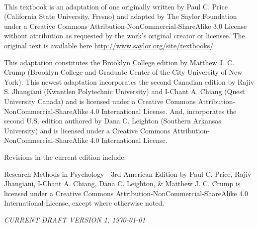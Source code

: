\documentclass[oneside]{tufte-book}
\begin{document}
\newpage
\begin{fullwidth}
~\vfill
\thispagestyle{empty}
\setlength{\parindent}{0pt}
\setlength{\parskip}{\baselineskip}

\par{}

\par

This textbook is an adaptation of one originally written by Paul C. Price (California State University, Fresno) and adapted by The Saylor Foundation under a Creative Commons Attribution-NonCommercial-ShareAlike 3.0 License without attribution as requested by the work's original creator or licensee. The original text is available here \url{http://www.saylor.org/site/textbooks/}

This adaptation constitutes the Brooklyn College edition by Matthew J. C. Crump (Brooklyn College and Graduate Center of the City University of New York). This newest adaptation incorporates the second Canadian edition by Rajiv S. Jhangiani (Kwantlen Polytechnic University) and I-Chant A. Chiang (Quest University Canada) and is licensed under a Creative Commons Attribution-NonCommercial-ShareAlike 4.0 International License. And, incorporates the second U.S. edition authored by Dana C. Leighton (Southern Arkansas University) and is licensed under a Creative Commons Attribution-NonCommercial-ShareAlike 4.0 International License. 

Revisions in the current edition include:

Research Methods in Psychology - 3rd American Edition by Paul C. Price, Rajiv Jhangiani, I-Chant A. Chiang, Dana C. Leighton, \& Matthew J. C. Crump is licensed under a Creative Commons Attribution-NonCommercial-ShareAlike 4.0 International License, except where otherwise noted.




\par\textit{CURRENT DRAFT VERSION 1, \today}
\end{fullwidth}


\tableofcontents




\end{document}
